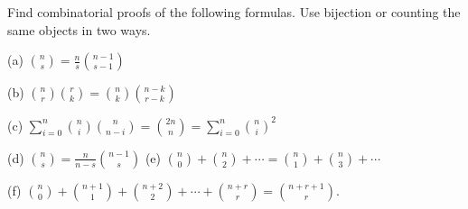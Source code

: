 Find combinatorial proofs of the following formulas. Use bijection or counting the same objects in two ways.

(a) $\binom{n}{s} = \frac{n}{s}\binom{n - 1}{s - 1}$

(b) $\binom{n}{r}\binom{r}{k} = \binom{n}{k}\binom{n - k}{r - k}$

(c) $\sum_{i=0}^n \binom{n}{i}\binom{n}{n - i} = \binom{2n}{n} = \sum_{i=0}^n \binom{n}{i}^2$

(d) $\binom{n}{s} = \frac{n}{n - s}\binom{n - 1}{s}$ \quad (e) $\binom{n}{0} + \binom{n}{2} + \cdots = \binom{n}{1} + \binom{n}{3} + \cdots$

(f) $\binom{n}{0} + \binom{n + 1}{1} + \binom{n + 2}{2} + \cdots + \binom{n + r}{r} = \binom{n + r + 1}{r}$.
